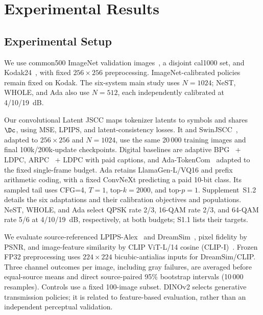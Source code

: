 \section{Experimental Results}
\ifCLASSOPTIONonecolumn\fi
\subsection{Experimental Setup}
We use common500 ImageNet validation images~\cite{imagenet}, a disjoint cal1000 set, and Kodak24~\cite{kodak}, with fixed $256\times256$ preprocessing. ImageNet-calibrated policies remain fixed on Kodak. The six-system main study uses $N=1024$; NeST, WHOLE, and Ada also use $N=512$, each independently calibrated at 4/10/19~dB.

Our convolutional Latent JSCC maps tokenizer latents to symbols and shares $\Dc$, using MSE, LPIPS, and latent-consistency losses. It and SwinJSCC~\cite{swinjscc}, adapted to $256\times256$ and $N{=}1024$, use the same 20\,000 training images and final 100k/200k-update checkpoints. Digital baselines are adaptive BPG~\cite{bpg} + LDPC, ARPC~\cite{arpc} + LDPC with paid captions, and Ada-TokenCom~\cite{adatokencom} adapted to the fixed single-frame budget. Ada retains LlamaGen-L/VQ16 and prefix arithmetic coding, with a fixed ConvNeXt predicting a paid 10-bit class. Its sampled tail uses CFG=4, $T=1$, top-$k=2000$, and top-$p=1$. Supplement~S1.2 details the six adaptations and their calibration objectives and populations. NeST, WHOLE, and Ada select QPSK rate 2/3, 16-QAM rate 2/3, and 64-QAM rate 5/6 at 4/10/19~dB, respectively, at both budgets; S1.1 lists their targets.

We evaluate source-referenced LPIPS-Alex~\cite{lpips} and DreamSim~\cite{dreamsim}, pixel fidelity by PSNR, and image-feature similarity by CLIP ViT-L/14 cosine (CLIP-I)~\cite{clip}. Frozen FP32 preprocessing uses $224\times224$ bicubic-antialias inputs for DreamSim/CLIP. Three channel outcomes per image, including gray failures, are averaged before equal-source means and direct source-paired 95\% bootstrap intervals (10\,000 resamples). Controls use a fixed 100-image subset. DINOv2 selects generative transmission policies; it is related to feature-based evaluation, rather than an independent perceptual validation.

\ifCLASSOPTIONonecolumn\else\fi
